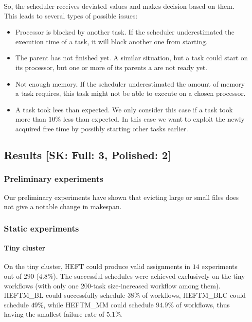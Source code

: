 \documentclass[conference]{IEEEtran}
\newcommand{\algo}[1]{\textsc{#1}}
\newcommand{\heft}{\algo{HEFT}\xspace}
\newcommand{\heftmm}{\algo{HEFTM\_MM}\xspace}
\newcommand{\heftbl}{\algo{HEFTM\_BL}\xspace}
\newcommand{\heftblc}{\algo{HEFTM\_BLC}\xspace}
\newcommand{\skug}[1]{{\color{blue}[SK: #1]}}
\begin{document}
    So, the scheduler receives deviated values and makes decision based on them.
    This leads to several types of possible issues:
    \begin{itemize}
        \item Processor is blocked by another task. If the scheduler underestimated the execution time of a task, it will block another
        one from starting.
        \item The parent has not finished yet. A similar situation, but a task could start on its processor, but one or more of its parents a
        are not ready yet.
        \item Not enough memory. If the scheduler underestimated the amount of memory a task requires, this task might not be able
        to execute on a chosen processor.
        \item A task took lees than expected. We only consider this case if a task took more than 10\% less than expected. In this
        case we want to exploit the newly acquired free time by possibly starting other tasks earlier.
    \end{itemize}



    \subsection{Results \skug{Full: 3, Polished: 2}}

    \subsubsection{Preliminary experiments}

    Our preliminary experiments have shown that evicting large or small files does not give a notable change in makespan.


    \subsubsection{Static experiments}
    \paragraph{Tiny cluster}

    On the tiny cluster, \heft could produce valid assignments in $14$ experiments out of $290$ ($4.8\%$).
    The successful schedules were achieved exclusively on the tiny workflows (with only one 200-task size-increased
    workflow among them).
    \heftbl could successfully schedule $38\%$ of workflows, \heftblc could schedule $49\%$, while \heftmm could schedule
    $94.9\%$ of workflows, thus having the smallest failure rate of $5.1\%$.
\end{document}
